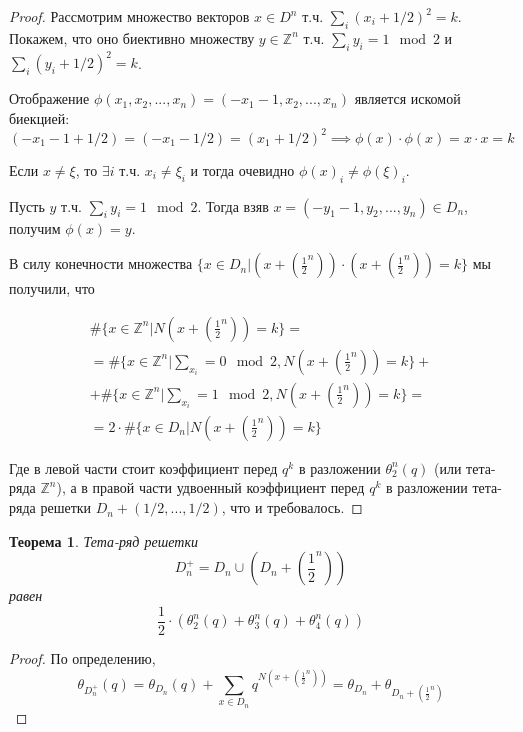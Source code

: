 \documentclass{article}
\newcommand{\ZZ}{\mathbb{Z}}
\theoremstyle{break}
\newtheorem{theorem}{Теорема}[section]
\begin{document}
\begin{proof}
	Рассмотрим множество векторов $x \in D^n$ т.ч. $\sum_i ({x_i} + 1/2)^2=k$.
	Покажем, что оно биективно множеству $y \in \ZZ^n$ т.ч. $\sum_i y_i = 1 \mod 2$ и $\sum_i ({y_i} + 1/2)^2=k$.
	
	Отображение $\phi(x_1, x_2, ..., x_n) = (-x_1 - 1, x_2, ..., x_n)$ является искомой биекцией:
		\begin{equation}(-x_1 - 1 + 1/2) = (-x_1 - 1/2) = (x_1 + 1/2)^2 \implies \phi(x) \cdot \phi(x) = x \cdot x = k\end{equation}
		
	Если $x \ne \xi$, то $\exists i$ т.ч. $x_i \ne \xi_i$ и тогда очевидно $\phi(x)_i \ne \phi(\xi)_i$.
	
	Пусть $y$ т.ч. $\sum_i y_i = 1 \mod 2$. Тогда взяв $x=(-y_1-1, y_2, ..., y_n) \in D_n$, получим $\phi(x)=y$.
	
	В силу конечности множества $\{x \in D_n | (x + (\frac{1}{2}^n)) \cdot (x + (\frac{1}{2}^n)) = k\}$
	мы получили, что
	
	\begin{gather*}
		\#\{x \in \ZZ^n | N(x  + (\frac{1}{2}^n)) = k\} = \\
= \#\{x \in \ZZ^n | \sum_{x_i} = 0 \mod 2,  N(x  + (\frac{1}{2}^n)) = k\} + \\
+  \#\{x \in \ZZ^n | \sum_{x_i} = 1 \mod 2,  N(x  + (\frac{1}{2}^n)) = k\} = \\
=	2 \cdot \#\{x \in D_n | N(x  + (\frac{1}{2}^n)) = k\}
	\end{gather*}

	Где в левой части стоит коэффициент перед $q^k$ в разложении $\theta_2^n(q)$ 
	(или тета-ряда $\ZZ^n$), а в правой части удвоенный коэффициент перед $q^k$ в 
	разложении тета-ряда решетки $D_n + (1/2, ..., 1/2)$, что и требовалось.
\end{proof}

\begin{theorem}
	Тета-ряд решетки 
	\begin{equation}
		D_n^+ = D_n \cup (D_n + (\frac{1}{2}^n))
	\end{equation}
	равен 
	\begin{equation}
		\frac{1}{2} \cdot (\theta_{2}^n(q) + \theta_{3}^n(q) + \theta_4^n(q))
	\end{equation}
\end{theorem}
\begin{proof}
	По определению, 
	\begin{equation}
	\theta_{D_n^+}(q) 
	= \theta_{D_n}(q) + \sum_{x \in D_n} q^{N(x + (\frac{1}{2}^n))}
	= \theta_{D_n} + \theta_{D_n + (\frac{1}{2}^n)}
	\end{equation}
\end{proof}
\end{document}
